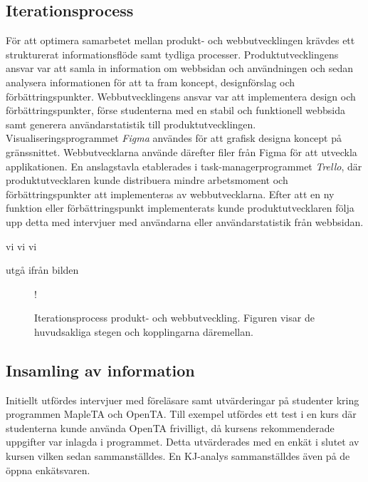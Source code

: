 \subsection{Iterationsprocess}

För att optimera samarbetet mellan produkt- och webbutvecklingen krävdes ett strukturerat informationsflöde samt tydliga processer. Produktutvecklingens ansvar var att samla in information om webbsidan och användningen och sedan analysera informationen för att ta fram koncept, designförslag och förbättringspunkter. Webbutvecklingens ansvar var att implementera design och förbättringspunkter, förse studenterna med en stabil och funktionell webbsida samt generera användarstatistik till produktutvecklingen.  
Visualiseringsprogrammet \emph{Figma} användes för att grafisk designa koncept på gränssnittet. Webbutvecklarna använde därefter filer från Figma för att utveckla applikationen. En anslagstavla etablerades i task-managerprogrammet \emph{Trello}, där produktutvecklaren kunde distribuera mindre arbetsmoment och förbättringspunkter att implementeras av webbutvecklarna. Efter att en ny funktion eller förbättringspunkt implementerats kunde produktutvecklaren följa upp detta med intervjuer med användarna eller användarstatistik från webbsidan.   

vi vi vi 

utgå ifrån bilden

\begin{center}
\begin{figure}[H]
    \centering
     {!} {
        
    }
    \caption{Iterationsprocess produkt-  och webbutveckling. Figuren visar de huvudsakliga stegen och kopplingarna däremellan.}
    \label{fig:iteration_process}
\end{figure}
\end{center}

\subsection{Insamling av information}
Initiellt utfördes intervjuer med föreläsare samt utvärderingar på studenter kring programmen MapleTA och OpenTA. Till exempel utfördes ett test i en kurs där studenterna kunde använda OpenTA frivilligt, då kursens rekommenderade uppgifter var inlagda i programmet. Detta utvärderades med en enkät i slutet av kursen vilken sedan sammanställdes. En KJ-analys sammanställdes även på de öppna enkätsvaren. 

